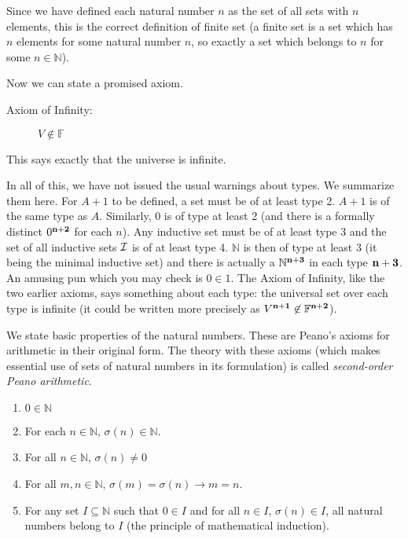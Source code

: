 \documentclass[12pt]{book}
\begin{document}
Since we have defined each natural number $n$ as the set of all sets
with $n$ elements, this is the correct definition of finite set (a
finite set is a set which has $n$ elements for some natural number
$n$, so exactly a set which belongs to $n$ for some $n \in {\mathbb
N}$).

Now we can state a promised axiom.

\begin{description}

\item[Axiom of Infinity:]  $V \not\in {\mathbb F}$

\end{description}

This says exactly that the universe is infinite.

In all of this, we have not issued the usual warnings about types.  We
summarize them here.  For $A+1$ to be defined, a set must be of at
least type 2.  $A+1$ is of the same type as $A$.  Similarly, 0 is of
type at least 2 (and there is a formally distinct $0^{\bf n+2}$ for each
$n$).  Any inductive set must be of at least type 3 and the set of all
inductive sets $\cal I$ is of at least type 4.  $\mathbb N$ is then of
type at least 3 (it being the minimal inductive set) and there is
actually a $\mathbb N^{\bf n+3}$ in each type $\bf n+3$.  An amusing pun which
you may check is $0 \in 1$.  The Axiom of Infinity, like the two
earlier axioms, says something about each type: the universal set over
each type is infinite (it could be written more precisely as $V^{\bf n+1}
\not\in {\mathbb F}^{\bf n+2}$).

We state basic properties of the natural numbers.  These are Peano's
axioms for arithmetic in their original form.  The theory with these
axioms (which makes essential use of sets of natural numbers in its
formulation) is called {\em second-order Peano arithmetic\/}.

\begin{enumerate}

\item $0 \in {\mathbb N}$

\item For each $n \in {\mathbb N}$, $\sigma(n) \in {\mathbb N}$.

\item For all $n \in {\mathbb N}$, $\sigma(n) \neq 0$

\item For all $m,n \in {\mathbb N}$, $\sigma(m)=\sigma(n)\rightarrow m=n$.

\item For any set $I \subseteq {\mathbb N}$ such that $0 \in I$ and
for all $n\in I$, $\sigma(n) \in I$, all natural numbers belong to $I$ (the
principle of mathematical induction).

\end{enumerate}
\end{document}
